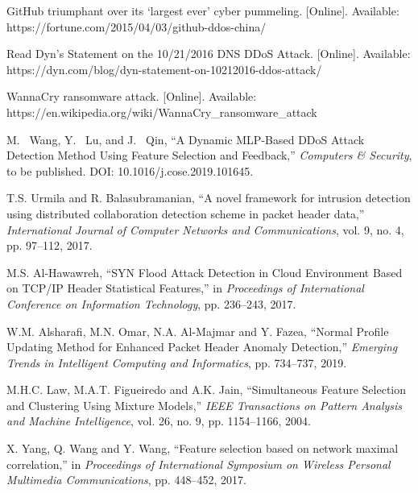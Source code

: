 \documentclass{ieeeaccess}
\theoremstyle{definition}
\begin{document}
% 
\begin{thebibliography}{00}
    GitHub triumphant over its ‘largest ever’ cyber pummeling. [Online]. Available: \\ https://fortune.com/2015/04/03/github-ddos-china/

    Read Dyn’s Statement on the 10/21/2016 DNS DDoS Attack. [Online]. Available: \\ https://dyn.com/blog/dyn-statement-on-10212016-ddos-attack/

    WannaCry ransomware attack. [Online]. Available: \\ https://en.wikipedia.org/wiki/WannaCry\_ransomware\_attack

    M. ~Wang, Y. ~Lu, and J. ~Qin, ``A Dynamic MLP-Based DDoS Attack Detection Method Using Feature Selection and Feedback,'' \emph{Computers \& Security}, to be published. DOI: 10.1016/j.cose.2019.101645.

    T.S. Urmila and R. Balasubramanian, ``A novel framework for intrusion detection using distributed collaboration detection scheme in packet header data,'' \emph{International Journal of Computer Networks and Communications}, vol. 9, no. 4, pp. 97--112, 2017.

    M.S. Al-Hawawreh, ``SYN Flood Attack Detection in Cloud Environment Based on TCP/IP Header Statistical Features,'' in \emph{Proceedings of International Conference on Information Technology}, pp. 236--243, 2017.

    W.M. Alsharafi, M.N. Omar, N.A. Al-Majmar and Y. Fazea, ``Normal Profile Updating Method for Enhanced Packet Header Anomaly Detection,'' \emph{Emerging Trends in Intelligent Computing and Informatics}, pp. 734--737, 2019.

    M.H.C. Law, M.A.T. Figueiredo and A.K. Jain, ``Simultaneous Feature Selection and Clustering Using Mixture Models,'' \emph{IEEE Transactions on Pattern Analysis and Machine Intelligence}, vol. 26, no. 9, pp. 1154--1166, 2004.

    X. Yang, Q. Wang and Y. Wang, ``Feature selection based on network maximal correlation,'' in \emph{Proceedings of International Symposium on Wireless Personal Multimedia Communications}, pp. 448--452, 2017.


\end{thebibliography}
\end{document}

